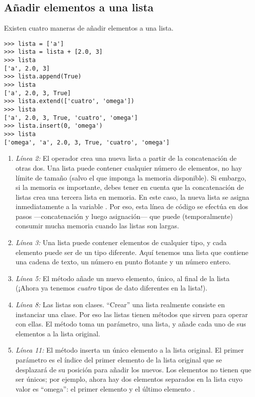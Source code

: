\subsection{Añadir elementos a una lista}

Existen cuatro maneras de añadir elementos a una lista.

\noindent\begin{minipage}{\textwidth}
\begin{lstlisting}[mathescape=True]
>>> lista = ['a']
>>> lista = lista + [2.0, 3]
>>> lista
['a', 2.0, 3]
>>> lista.append(True)
>>> lista
['a', 2.0, 3, True]
>>> lista.extend(['cuatro', 'omega'])
>>> lista
['a', 2.0, 3, True, 'cuatro', 'omega']
>>> lista.insert(0, 'omega')
>>> lista
['omega', 'a', 2.0, 3, True, 'cuatro', 'omega']
\end{lstlisting}
\end{minipage}

\begin{enumerate}

\item \emph{Línea 2:} El operador \codigo{+} crea una nueva lista a partir de la concatenación de otras dos. Una lista puede contener cualquier número de elementos, no hay límite de tamaño (salvo el que imponga la memoria disponible). Si embargo, si la memoria es importante, debes tener en cuenta que la concatenación de listas crea una tercera lista en memoria. En este caso, la nueva lista se asigna inmediatamente a la variable . Por eso, esta línea de código se efectúa en dos pasos ---concatenación y luego asignación--- que puede (temporalmente) consumir mucha memoria cuando las listas son largas.

\item \emph{Línea 3:} Una lista puede contener elementos de cualquier tipo, y cada elemento puede ser de un tipo diferente. Aquí tenemos una lista que contiene una cadena de texto, un número en punto flotante y un número entero.

\item \emph{Línea 5:} El método  añade un nuevo elemento, único, al final de la lista (¡Ahora ya tenemos \emph{cuatro} tipos de dato diferentes en la lista!).

\item \emph{Línea 8:} Las listas son clases. ``Crear'' una lista realmente consiste en instanciar una clase. Por eso las listas tienen métodos que sirven para operar con ellas. El método  toma un parámetro, una lista, y añade cada uno de sus elementos a la lista original.

\item \emph{Línea 11:} El método  inserta un único elemento a la lista original. El primer parámetro es el índice del primer elemento de la lista original que se desplazará de su posición para añadir los nuevos. Los elementos no tienen que ser únicos; por ejemplo, ahora hay dos elementos separados en la lista cuyo valor es ``omega'': el primer elemento  y el último elemento .

\end{enumerate}

